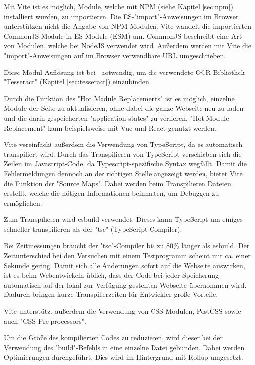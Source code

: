 
\label{sec:npm-dependency-resolving}

Mit Vite ist es möglich, Module, welche mit NPM (siehe Kapitel \ref{sec:npm}) installiert wurden, zu importieren. 
Die ES-"import"-Anweisungen im Browser unterstützen nicht die Angabe von NPM-Modulen. Vite wandelt die importierten CommonJS-Module in ES-Module (ESM) um. CommonJS beschreibt eine Art von Modulen, welche bei NodeJS verwendet wird. Außerdem werden mit Vite die "import"-Anweisungen auf im Browser verwendbare URL umgeschrieben. \cite{ViteFeatures}


Diese Modul-Auflösung ist bei \ZELIA\ notwendig, um die verwendete OCR-Bibliothek "Tesseract" (Kapitel \ref{sec:tesseract}) einzubinden. 

\label{sec:hot-module-replacement}

Durch die Funktion des "Hot Module Replacements" ist es möglich, einzelne Module der Seite zu aktualisieren, ohne dabei die ganze Webseite neu zu laden und die darin gespeicherten "application states" zu verlieren. "Hot Module Replacement" kann beispielsweise mit Vue und React genutzt werden. \cite{ViteFeatures}
  
 \label{sec:typescript-vite}

Vite vereinfacht außerdem die Verwendung von TypeScript, da es automatisch transpiliert wird. 
Durch das Transpilieren von TypeScript verschieben sich die Zeilen im Javascript-Code, da Typescript-spezifische Syntax wegfällt. 
Damit die Fehler\-meldungen dennoch an der richtigen Stelle angezeigt werden, bietet Vite die Funktion der "Source Maps". 
Dabei werden beim Transpilieren Dateien erstellt, welche die nötigen Informationen beinhalten, um Debuggen zu ermöglichen.

Zum Transpilieren wird esbuild \cite{esbuild} verwendet. Dieses kann TypeScript um einiges schneller transpilieren als der "tsc" (TypeScript Compiler). \cite{ViteFeatures}

Bei Zeitmessungen braucht der "tsc"-Compiler bis zu 80\% länger als esbuild. Der Zeitunterschied bei den Versuchen mit einem Testprogramm scheint mit ca. einer Sekunde gering. 
Damit sich alle Änderungen sofort auf die Webseite auswirken, ist es beim Web\-entwickeln üblich, dass der Code bei jeder Speicherung automatisch auf der lokal zur Verfügung gestellten Webseite übernommen wird. Dadurch bringen kurze Transpilierzeiten für Entwickler große Vorteile. 

\label{sec:css-vite}

Vite unterstützt außerdem die Verwendung von CSS-Modulen, PostCSS sowie auch "CSS Pre-processors". \cite{ViteFeatures}

\label{sec:bundling-vite}

Um die Größe des kompilierten Codes zu reduzieren, wird dieser bei der Verwendung des "build"-Befehls in eine einzelne Datei gebunden. 
Dabei werden Optimierungen durchgeführt. Dies wird im Hintergrund mit Rollup \cite{Rollup} umgesetzt. 
